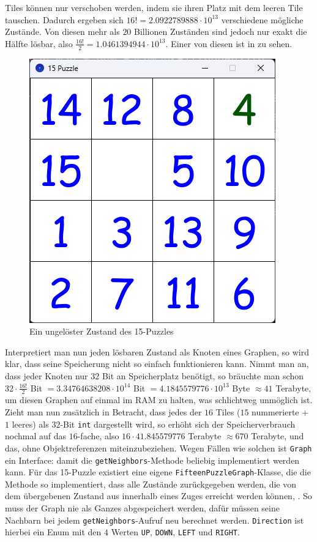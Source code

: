                 Tiles können nur verschoben werden, indem sie ihren Platz mit dem leeren Tile tauschen. Dadurch ergeben sich $16! = 2.0922789888 \cdot 10^{13}$ verschiedene mögliche Zustände. Von diesen mehr als $20$ Billionen Zuständen sind jedoch nur exakt die Hälfte lösbar, also $\frac{16!}{2} = 1.0461394944 \cdot 10^{13}$. Einer von diesen ist in  zu sehen.
                
                \begin{figure}
                    \centering
                    \includegraphics[width=0.5\linewidth]{images/15-puzzle-shuffled.png}
                    \caption{Ein ungelöster Zustand des 15-Puzzles}
                    \label{fig:15-shuffled}
                \end{figure}
                
                Interpretiert man nun jeden lösbaren Zustand als Knoten eines Graphen, so wird klar, dass seine Speicherung nicht so einfach funktionieren kann. Nimmt man an, dass jeder Knoten nur $32$ Bit an Speicherplatz benötigt, so bräuchte man schon $32 \cdot \frac{16!}{2}$ Bit $= 3.34764638208 \cdot 10^{14}$ Bit $= 4.1845579776 \cdot 10^{13}$ Byte $\approx 41$ Terabyte, um diesen Graphen auf einmal im RAM zu halten, was schlichtweg unmöglich ist. Zieht man nun zusätzlich in Betracht, dass jedes der $16$ Tiles ($15$ nummerierte + $1$ leeres) als $32$-Bit \lstinline{int} dargestellt wird, so erhöht sich der Speicherverbrauch nochmal auf das $16$-fache, also $16 \cdot 41.845579776$ Terabyte $\approx 670$ Terabyte, und das, ohne Objektreferenzen miteinzubeziehen. Wegen Fällen wie solchen ist \lstinline{Graph} ein Interface: damit die \lstinline{getNeighbors}-Methode beliebig implementiert werden kann. Für das 15-Puzzle existiert eine eigene \lstinline{FifteenPuzzleGraph}-Klasse, die die Methode so implementiert, dass alle Zustände zurückgegeben werden, die von dem übergebenen Zustand aus innerhalb eines Zuges erreicht werden können, . So muss der Graph nie als Ganzes abgespeichert werden, dafür müssen seine Nachbarn bei jedem \lstinline{getNeighbors}-Aufruf neu berechnet werden. \lstinline{Direction} ist hierbei ein Enum mit den $4$ Werten \lstinline{UP}, \lstinline{DOWN}, \lstinline{LEFT} und \lstinline{RIGHT}.
                
